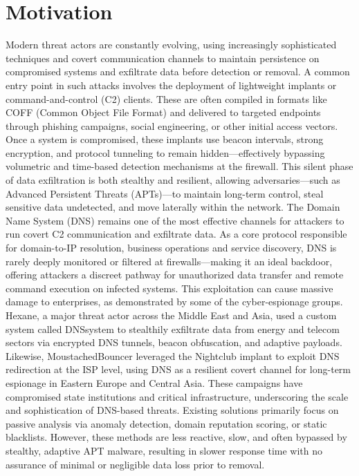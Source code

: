 \documentclass [11pt, proquest] {uwthesis}[2020/02/24]
\begin{document}
\section{Motivation}
Modern threat actors are constantly evolving, using increasingly sophisticated techniques and covert communication channels to maintain persistence on compromised systems and exfiltrate data before detection or removal. A common entry point in such attacks involves the deployment of lightweight implants or command-and-control (C2) clients. These are often compiled in formats like COFF (Common Object File Format) and delivered to targeted endpoints through phishing campaigns, social engineering, or other initial access vectors.
Once a system is compromised, these implants use beacon intervals, strong encryption, and protocol tunneling to remain hidden—effectively bypassing volumetric and time-based detection mechanisms at the firewall. This silent phase of data exfiltration is both stealthy and resilient, allowing adversaries—such as Advanced Persistent Threats (APTs)—to maintain long-term control, steal sensitive data undetected, and move laterally within the network.
The Domain Name System (DNS) remains one of the most effective channels for attackers to run covert C2 communication and exfiltrate data. As a core protocol responsible for domain-to-IP resolution, business operations and service discovery, DNS is rarely deeply monitored or filtered at firewalls—making it an ideal backdoor, offering attackers a discreet pathway for unauthorized data transfer and remote command execution on infected systems. 
This exploitation can cause massive damage to enterprises, as demonstrated by some of the cyber-espionage groups. Hexane, a major threat actor across the Middle East and Asia, used a custom system called DNSsystem to stealthily exfiltrate data from energy and telecom sectors via encrypted DNS tunnels, beacon obfuscation, and adaptive payloads. Likewise, MoustachedBouncer leveraged the Nightclub implant to exploit DNS redirection at the ISP level, using DNS as a resilient covert channel for long-term espionage in Eastern Europe and Central Asia. These campaigns have compromised state institutions and critical infrastructure, underscoring the scale and sophistication of DNS-based threats.
Existing solutions primarily focus on passive analysis via anomaly detection, domain reputation scoring, or static blacklists. However, these methods are less reactive, slow, and often bypassed by stealthy, adaptive APT malware, resulting in slower response time with no assurance of minimal or negligible data loss prior to removal.
\end{document}
